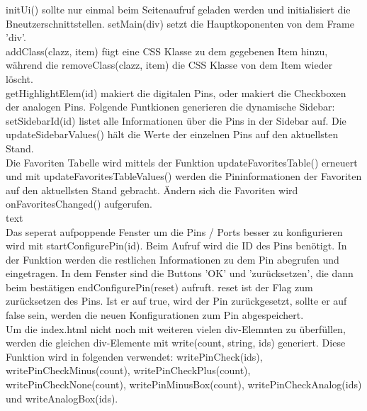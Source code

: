 \textrm{initUi()} sollte nur einmal beim Seitenaufruf geladen werden und
initialisiert die Bneutzerschnittstellen. \textrm{setMain(div)} setzt die
Hauptkoponenten von dem Frame 'div'.\\
\textrm{addClass(clazz, item)} fügt eine CSS Klasse zu dem gegebenen Item hinzu,
während die \textrm{removeClass(clazz, item)} die CSS Klasse von dem Item wieder
löscht.\\
\textrm{getHighlightElem(id)} makiert die digitalen Pins, oder makiert die
Checkboxen der analogen Pins.
Folgende Funtkionen generieren die dynamische Sidebar: \textrm{setSidebarId(id)}
listet alle Informationen über die Pins in der Sidebar auf. Die
\textrm{updateSidebarValues()} hält die Werte der einzelnen Pins auf den
aktuellsten Stand.\\
Die Favoriten Tabelle wird mittels der Funktion \textrm{updateFavoritesTable()}
erneuert und mit \textrm{updateFavoritesTableValues()} werden die Pininformationen 
der Favoriten auf den aktuellsten Stand gebracht. Ändern sich die
Favoriten wird \textrm{onFavoritesChanged()} aufgerufen.\\
\textrm{text}\\
Das seperat aufpoppende Fenster um die Pins / Ports besser zu konfigurieren wird
mit \textrm{startConfigurePin(id)}. Beim Aufruf wird die ID des Pins benötigt.
In der Funktion werden die restlichen Informationen zu dem Pin abegrufen und
eingetragen. In dem Fenster sind die Buttons 'OK' und 'zurücksetzen', die dann
beim bestätigen \textrm{endConfigurePin(reset)} aufruft. reset ist der Flag
zum zurücksetzen des Pins. Ist er auf true, wird der Pin zurückgesetzt, sollte
er auf false sein, werden die neuen Konfigurationen zum Pin abgespeichert.\\
Um die index.html nicht noch mit weiteren vielen div-Elemnten zu
überfüllen, werden die gleichen div-Elemente mit \textrm{write(count, string,
ids)} generiert. Diese Funktion wird in folgenden verwendet:
\textrm{writePinCheck(ids)}, \textrm {writePinCheckMinus(count)},
\textrm{writePinCheckPlus(count)}, \textrm{writePinCheckNone(count)},
\textrm{writePinMinusBox(count)}, \textrm{writePinCheckAnalog(ids)} und
\textrm{writeAnalogBox(ids)}.



